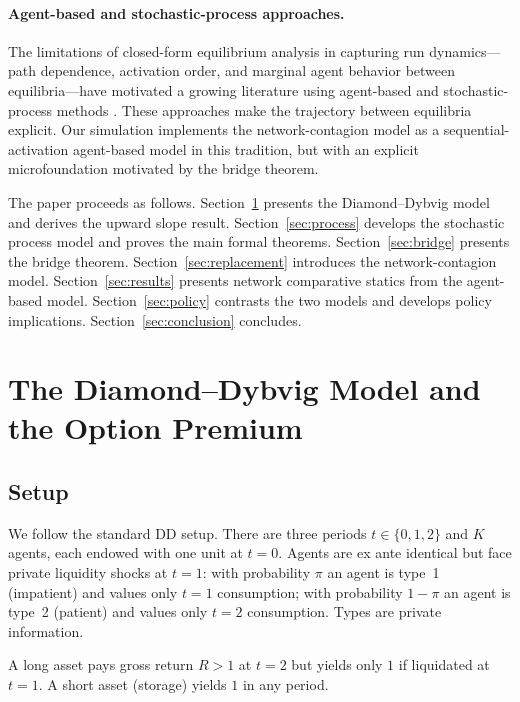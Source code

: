 \documentclass[12pt]{article}\usepackage[]{graphicx}\usepackage[]{xcolor}
\begin{document}
\paragraph{Agent-based and stochastic-process approaches.}
The limitations of closed-form equilibrium analysis in capturing run dynamics---path dependence, activation order, and marginal agent behavior between equilibria---have motivated a growing literature using agent-based and stochastic-process methods \citep{bookstaber2017end}.
These approaches make the trajectory between equilibria explicit.
Our simulation implements the network-contagion model as a sequential-activation agent-based model in this tradition, but with an explicit microfoundation motivated by the bridge theorem.


The paper proceeds as follows.
Section~\ref{sec:dd} presents the Diamond--Dybvig model and derives the upward slope result.
Section~\ref{sec:process} develops the stochastic process model and proves the main formal theorems.
Section~\ref{sec:bridge} presents the bridge theorem.
Section~\ref{sec:replacement} introduces the network-contagion model.
Section~\ref{sec:results} presents network comparative statics from the agent-based model.
Section~\ref{sec:policy} contrasts the two models and develops policy implications.
Section~\ref{sec:conclusion} concludes.

\section{The Diamond--Dybvig Model and the Option Premium}
\label{sec:dd}

\subsection{Setup}



We follow the standard DD setup.
There are three periods $t \in \{0, 1, 2\}$ and $K$ agents, each endowed with one unit at $t=0$.
Agents are ex ante identical but face private liquidity shocks at $t=1$: with probability $\pi$ an agent is type~1 (impatient) and values only $t=1$ consumption; with probability $1-\pi$ an agent is type~2 (patient) and values only $t=2$ consumption.
Types are private information.

A long asset pays gross return $R > 1$ at $t=2$ but yields only $1$ if liquidated at $t=1$.
A short asset (storage) yields $1$ in any period.
\end{document}
